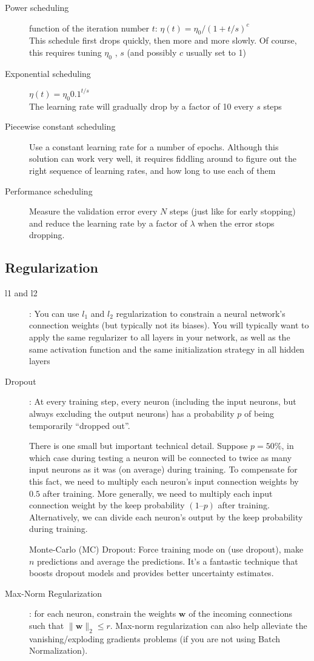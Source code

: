 \documentclass[french]{article}
\begin{document}
\begin{description}
    \item[Power scheduling] function of the iteration number $t$: $\eta(t) = \eta_0 / (1+ t/s)^c$ \\
      This schedule first drops quickly, then more and more slowly. Of course, this requires tuning $\eta_0$ , $s$ (and possibly $c$ usually set to 1)
    \item[Exponential scheduling] $\eta(t) = \eta_0 0.1^{t/s}$ \\
    The learning rate will gradually drop by a factor of 10 every $s$ steps
    \item[Piecewise constant scheduling] Use a constant learning rate for a number of epochs. Although this solution can work very well, it requires fiddling around to figure out the right sequence of learning rates, and how long to use each of them
    \item[Performance scheduling] Measure the validation error every $N$ steps (just like for early stopping) and reduce the learning rate by a factor of $\lambda$ when the error stops dropping.
\end{description}

\subsection{Regularization}

\begin{description}
    \item[l1 and l2]: You can use $l_1$ and $l_2$ regularization to constrain a neural network’s connection weights (but typically not its biases). You will typically want to apply the same regularizer to all layers in your network, as well as the same activation function and the same initialization strategy in all hidden layers
    \item[Dropout]: At every training step, every neuron (including the input neurons, but always excluding the output neurons) has a probability $p$ of being temporarily “dropped out”.

There is one small but important technical detail. Suppose $p = 50\%$, in which case during testing a neuron will be connected to twice as many input neurons as it was (on average) during training. To compensate for this fact, we need to multiply each neuron’s input connection weights by $0.5$ after training. More generally, we need to multiply each input connection weight by the keep probability $(1 – p)$ after training. Alternatively, we can divide each neuron’s output by the keep probability during training.

    Monte-Carlo (MC) Dropout: Force training mode on (use dropout), make $n$ predictions and average the predictions. It's a fantastic technique that boosts dropout models and provides better uncertainty estimates.
    \item[Max-Norm Regularization]: for each neuron, constrain the weights $\bm{w}$ of the incoming connections such that $\|\bm{w}\|_2 \leq r$. Max-norm regularization can also help alleviate the vanishing/exploding gradients problems (if you are not using Batch Normalization).
\end{description}
\end{document}
